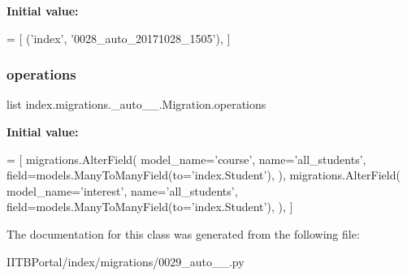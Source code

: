{\bfseries Initial value\+:}
\begin{DoxyCode}
=  [
        (\textcolor{stringliteral}{'index'}, \textcolor{stringliteral}{'0028\_auto\_20171028\_1505'}),
    ]
\end{DoxyCode}
\mbox{\label{classindex_1_1migrations_1_10029__auto__20171028__1537_1_1Migration_a62fa004b102c237417a6c20381966199}} 
\subsubsection{\texorpdfstring{operations}{operations}}
{\footnotesize\ttfamily list index.\+migrations.\+\_\+auto\+\_\+\_.\+Migration.\+operations\hspace{0.3cm}{\ttfamily [static]}}

{\bfseries Initial value\+:}
\begin{DoxyCode}
=  [
        migrations.AlterField(
            model\_name=\textcolor{stringliteral}{'course'},
            name=\textcolor{stringliteral}{'all\_students'},
            field=models.ManyToManyField(to=\textcolor{stringliteral}{'index.Student'}),
        ),
        migrations.AlterField(
            model\_name=\textcolor{stringliteral}{'interest'},
            name=\textcolor{stringliteral}{'all\_students'},
            field=models.ManyToManyField(to=\textcolor{stringliteral}{'index.Student'}),
        ),
    ]
\end{DoxyCode}


The documentation for this class was generated from the following file\+:\begin{DoxyCompactItemize}
\item 
I\+I\+T\+B\+Portal/index/migrations/0029\+\_\+auto\+\_\+\_.\+py\end{DoxyCompactItemize}
